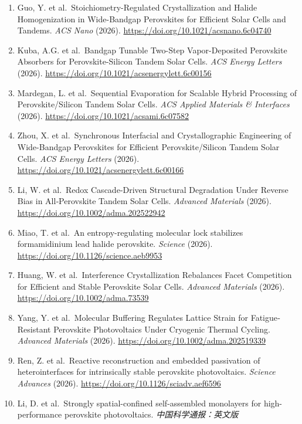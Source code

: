 \documentclass[
  11pt,
]{article}
\begin{document}
\begin{enumerate}
  Cells. \emph{Advanced Energy Materials} (2026).
  \url{https://doi.org/10.1002/aenm.71077}
\item
  Guo, Y. et al.~Stoichiometry-Regulated Crystallization and Halide
  Homogenization in Wide-Bandgap Perovskites for Efficient Solar Cells
  and Tandems. \emph{ACS Nano} (2026).
  \url{https://doi.org/10.1021/acsnano.6c04740}
\item
  Kuba, A.G. et al.~Bandgap Tunable Two-Step Vapor-Deposited Perovskite
  Absorbers for Perovskite-Silicon Tandem Solar Cells. \emph{ACS Energy
  Letters} (2026). \url{https://doi.org/10.1021/acsenergylett.6c00156}
\item
  Mardegan, L. et al.~Sequential Evaporation for Scalable Hybrid
  Processing of Perovskite/Silicon Tandem Solar Cells. \emph{ACS Applied
  Materials \& Interfaces} (2026).
  \url{https://doi.org/10.1021/acsami.6c07582}
\item
  Zhou, X. et al.~Synchronous Interfacial and Crystallographic
  Engineering of Wide-Bandgap Perovskites for Efficient
  Perovskite/Silicon Tandem Solar Cells. \emph{ACS Energy Letters}
  (2026). \url{https://doi.org/10.1021/acsenergylett.6c00166}
\item
  Li, W. et al.~Redox Cascade‐Driven Structural Degradation Under
  Reverse Bias in All‐Perovskite Tandem Solar Cells. \emph{Advanced
  Materials} (2026). \url{https://doi.org/10.1002/adma.202522942}
\item
  Miao, T. et al.~An entropy-regulating molecular lock stabilizes
  formamidinium lead halide perovskite. \emph{Science} (2026).
  \url{https://doi.org/10.1126/science.aeb9953}
\item
  Huang, W. et al.~Interference Crystallization Rebalances Facet
  Competition for Efficient and Stable Perovskite Solar Cells.
  \emph{Advanced Materials} (2026).
  \url{https://doi.org/10.1002/adma.73539}
\item
  Yang, Y. et al.~Molecular Buffering Regulates Lattice Strain for
  Fatigue‐Resistant Perovskite Photovoltaics Under Cryogenic Thermal
  Cycling. \emph{Advanced Materials} (2026).
  \url{https://doi.org/10.1002/adma.202519339}
\item
  Ren, Z. et al.~Reactive reconstruction and embedded passivation of
  heterointerfaces for intrinsically stable perovskite photovoltaics.
  \emph{Science Advances} (2026).
  \url{https://doi.org/10.1126/sciadv.aef6596}
\item
  Li, D. et al.~Strongly spatial-confined self-assembled monolayers for
  high-performance perovskite photovoltaics. \emph{中国科学通报：英文版}

\end{enumerate}
\end{document}
